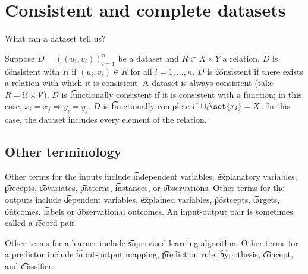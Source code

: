 \section*{Consistent and complete datasets}

What can a dataset tell us?

Suppose $D = ((u_i, v_i))_{i = 1}^{n}$ be a dataset and $R \subset X \times  Y$ a relation.
$D$ is \t{consistent with} $R$ if $(u_i, v_i) \in R$ for all $i = 1, \dots , n$.
$D$ is \t{consistent} if there exists a relation with which it is consistent.
A dataset is always consistent (take $R = \mathcal{U}  \times \mathcal{V} $).
$D$ is \t{functionally consistent} if it is consistent with a function; in this case, $x_i = x_j \Rightarrow y_i = y_j$.
$D$ is \t{functionally complete} if $\cup_i\set{x_i} = X$.
In this case, the dataset includes every element of the relation.

\subsection*{Other terminology}

Other terms for the inputs include \t{independent variables}, \t{explanatory variables}, \t{precepts}, \t{covariates}, \t{patterns}, \t{instances}, or \t{observations}.
Other terms for the outputs include \t{dependent variables}, \t{explained variables}, \t{postcepts}, \t{targets}, \t{outcomes}, \t{labels} or \t{observational outcomes}.
An input-output pair is sometimes called a \t{record pair}.

Other terms for a learner include \t{supervised learning algorithm}.
Other terms for a predictor include \t{input-output mapping}, \t{prediction rule}, \t{hypothesis}, \t{concept}, and \t{classifier}.
